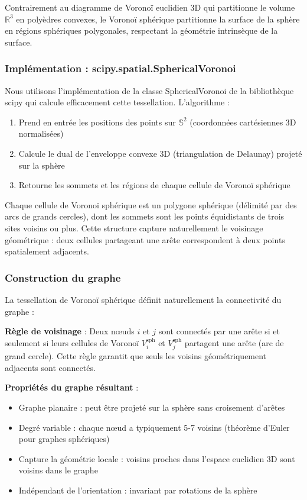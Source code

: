 Contrairement au diagramme de Voronoï euclidien 3D qui partitionne le volume $\mathbb{R}^3$ en polyèdres convexes, le Voronoï sphérique partitionne la surface de la sphère en régions sphériques polygonales, respectant la géométrie intrinsèque de la surface.

\subsubsection{Implémentation : scipy.spatial.SphericalVoronoi}

Nous utilisons l'implémentation de la classe SphericalVoronoi de la bibliothèque scipy qui calcule efficacement cette tessellation. L'algorithme :
\begin{enumerate}
    \item Prend en entrée les positions des points sur $\mathbb{S}^2$ (coordonnées cartésiennes 3D normalisées)
    \item Calcule le dual de l'enveloppe convexe 3D (triangulation de Delaunay) projeté sur la sphère
    \item Retourne les sommets et les régions de chaque cellule de Voronoï sphérique
\end{enumerate}

Chaque cellule de Voronoï sphérique est un polygone sphérique (délimité par des arcs de grands cercles), dont les sommets sont les points équidistants de trois sites voisins ou plus. Cette structure capture naturellement le voisinage géométrique : deux cellules partageant une arête correspondent à deux points spatialement adjacents.

\subsubsection{Construction du graphe}

La tessellation de Voronoï sphérique définit naturellement la connectivité du graphe :

\textbf{Règle de voisinage} : Deux nœuds $i$ et $j$ sont connectés par une arête si et seulement si leurs cellules de Voronoï $V_i^{\text{sph}}$ et $V_j^{\text{sph}}$ partagent une arête (arc de grand cercle). Cette règle garantit que seuls les voisins géométriquement adjacents sont connectés.

\textbf{Propriétés du graphe résultant} :
\begin{itemize}
    \item Graphe planaire : peut être projeté sur la sphère sans croisement d'arêtes
    \item Degré variable : chaque nœud a typiquement 5-7 voisins (théorème d'Euler pour graphes sphériques)
    \item Capture la géométrie locale : voisins proches dans l'espace euclidien 3D sont voisins dans le graphe
    \item Indépendant de l'orientation : invariant par rotations de la sphère
\end{itemize}

